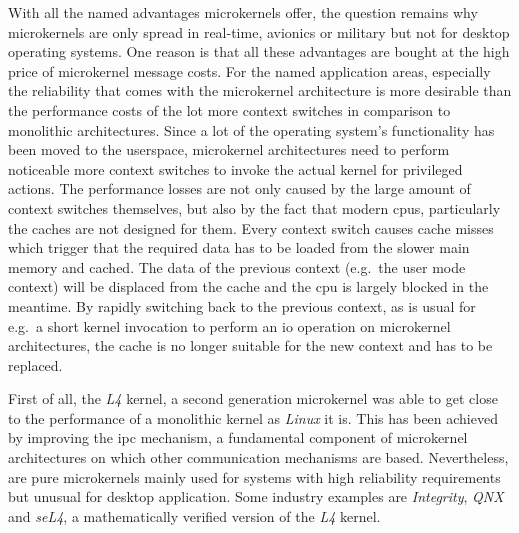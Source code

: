 With all the named advantages microkernels offer, the question remains why microkernels are only spread in real-time, avionics or military but not for desktop operating systems.
One reason is that all these advantages are bought at the high price of microkernel message costs.
For the named application areas, especially the reliability that comes with the microkernel architecture is more desirable than the performance costs of the lot more context switches in comparison to monolithic architectures\cite{tanenbaum-modern-operating-systems}.
Since a lot of the operating system's functionality has been moved to the userspace, microkernel architectures need to perform noticeable more context switches to invoke the actual kernel for privileged actions. 
The performance losses are not only caused by the large amount of context switches themselves, but also by the fact that modern \acp{cpu}, particularly the caches are not designed for them. 
Every context switch causes cache misses which trigger that the required data has to be loaded from the slower main memory and cached. 
The data of the previous context (e.g.\ the user mode context) will be displaced from the cache and the \ac{cpu} is largely blocked in the meantime.
By rapidly switching back to the previous context, as is usual for e.g.\ a short kernel invocation to perform an \ac{io} operation on microkernel architectures, the cache is no longer suitable for the new context and has to be replaced\cite{lfd430}.

First of all, the \textit{L4} kernel, a second generation microkernel was able to get close to the performance of a monolithic kernel as \textit{Linux} it is\cite{Hrtig1997}.   
This has been achieved by improving the \acf{ipc} mechanism, a fundamental component of microkernel architectures on which other communication mechanisms are based.
Nevertheless, are pure microkernels mainly used for systems with high reliability requirements but unusual for desktop application. 
Some industry examples are \textit{Integrity}, \textit{QNX} and \textit{seL4}, a mathematically verified version of the \textit{L4} kernel\cite{tanenbaum-modern-operating-systems}. 



